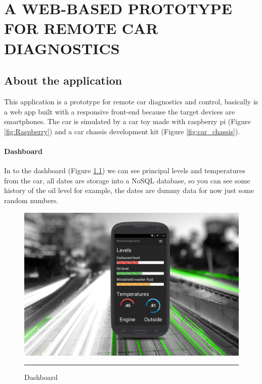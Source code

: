 
\chapter{A WEB-BASED PROTOTYPE FOR REMOTE CAR DIAGNOSTICS} %

\label{Chapter4} %


\section{About the application}
This application is a prototype for remote car diagnostics and control, basically is a web app built with a responsive front-end because the target devices are smartphones.
The car is simulated by a car toy made with raspberry pi (Figure \ref{fig:Raspberry}) and a car chassis development kit (Figure \ref{fig:car_chassis}). 

\subsubsection{Dashboard}
In to the dashboard (Figure \ref{fig:dashboard}) we can see principal levels and temperatures from the car, all dates are storage into a NoSQL database, so you can see some history of the oil level for example, the dates are dummy data for now just some random numbers.
\newpage
\begin{figure}[h!]
  \centering
    \includegraphics[width=1\textwidth]{./Pictures/dashboard.jpg}
  \rule{1\textwidth}{1pt}
 \caption{Dashboard}
  \label{fig:dashboard}
\end{figure}
